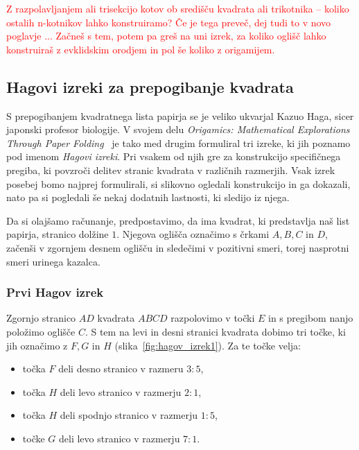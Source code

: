\textcolor{red}{Z razpolavljanjem ali trisekcijo kotov ob središču kvadrata ali trikotnika -- koliko ostalih n-kotnikov lahko konstruiramo? Če je tega preveč, dej tudi to v novo poglavje ... Začneš s tem, potem pa greš na uni izrek, za koliko oglišč lahko konstruiraš z evklidskim orodjem in pol še koliko z origamijem.}

\subsection{Hagovi izreki za prepogibanje kvadrata}

S prepogibanjem kvadratnega lista papirja se je veliko ukvarjal Kazuo Haga, sicer japonski profesor biologije. V svojem delu \emph{Origamics: Mathematical Explorations Through Paper Folding}~\cite{haga2008} je tako med drugim formuliral tri izreke, ki jih poznamo pod imenom \emph{Hagovi izreki}. Pri vsakem od njih gre za konstrukcijo specifičnega pregiba, ki povzroči delitev stranic kvadrata v različnih razmerjih. Vsak izrek posebej bomo najprej formulirali, si slikovno ogledali konstrukcijo in ga dokazali, nato pa si pogledali še nekaj dodatnih lastnosti, ki sledijo iz njega.

Da si olajšamo računanje, predpostavimo, da ima kvadrat, ki predstavlja naš list papirja, stranico dolžine $1$. Njegova oglišča označimo s črkami $A, B, C$ in $D$, začenši v zgornjem desnem oglišču in sledečimi v pozitivni smeri, torej nasprotni smeri urinega kazalca.

\subsubsection{Prvi Hagov izrek}

\begin{izrek}
    Zgornjo stranico $AD$ kvadrata $ABCD$ razpolovimo v točki $E$ in s pregibom nanjo položimo oglišče $C$. S tem na levi in desni stranici kvadrata dobimo tri točke, ki jih označimo z $F, G$ in $H$ (slika~\ref{fig:hagov_izrek1}). Za te točke velja:
    \begin{itemize}
        \item točka $F$ deli desno stranico v razmeru $3:5$,
        \item točka $H$ deli levo stranico v razmerju $2:1$,
        \item točka $H$ deli spodnjo stranico v razmerju $1:5$,
        \item točke $G$ deli levo stranico v razmerju $7:1$.
    \end{itemize}
\end{izrek}

